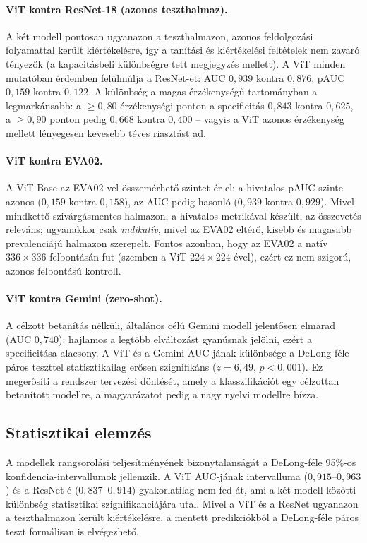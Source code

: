 \paragraph{ViT kontra ResNet-18 (azonos teszthalmaz).} A két modell pontosan
ugyanazon a teszthalmazon, azonos feldolgozási folyamattal került kiértékelésre,
így a tanítási és kiértékelési feltételek nem zavaró tényezők (a kapacitásbeli
különbségre tett megjegyzés mellett). A ViT minden mutatóban érdemben felülmúlja
a ResNet-et: AUC $0{,}939$ kontra $0{,}876$, pAUC $0{,}159$ kontra $0{,}122$. A
különbség a magas érzékenységű tartományban a legmarkánsabb: a $\ge 0{,}80$
érzékenységi ponton a specificitás $0{,}843$ kontra $0{,}625$, a $\ge 0{,}90$
ponton pedig $0{,}668$ kontra $0{,}400$ -- vagyis a ViT azonos érzékenység
mellett lényegesen kevesebb téves riasztást ad.

\paragraph{ViT kontra EVA02.} A ViT-Base
az EVA02-vel összemérhető szintet ér el: a
hivatalos pAUC szinte azonos ($0{,}159$ kontra $0{,}158$), az AUC pedig
hasonló ($0{,}939$ kontra $0{,}929$). Mivel mindkettő szivárgásmentes halmazon, a
hivatalos metrikával készült, az összevetés releváns; ugyanakkor csak
\emph{indikatív}, mivel az EVA02 eltérő, kisebb és magasabb prevalenciájú
halmazon szerepelt. Fontos azonban, hogy az EVA02 a natív $336\times336$ felbontásán fut
(szemben a ViT $224\times224$-ével), ezért ez nem szigorú, azonos felbontású
kontroll.

\paragraph{ViT kontra Gemini (zero-shot).} A célzott betanítás nélküli, általános
célú Gemini modell jelentősen elmarad (AUC $0{,}740$): hajlamos a legtöbb
elváltozást gyanúsnak jelölni, ezért a specificitása alacsony. A ViT és a Gemini
AUC-jának különbsége a DeLong-féle páros teszttel statisztikailag erősen
szignifikáns ($z = 6{,}49$, $p < 0{,}001$). Ez megerősíti a rendszer tervezési
döntését, amely a klasszifikációt egy célzottan betanított modellre, a
magyarázatot pedig a nagy nyelvi modellre bízza.

\subsection{Statisztikai elemzés}

A modellek rangsorolási teljesítményének bizonytalanságát a DeLong-féle 95\%-os
konfidencia-intervallumok jellemzik. A ViT AUC-jának intervalluma
($0{,}915$--$0{,}963$) és a ResNet-é ($0{,}837$--$0{,}914$) gyakorlatilag nem
fed át, ami a két modell közötti különbség statisztikai szignifikanciájára utal.
Mivel a ViT és a ResNet ugyanazon a teszthalmazon került kiértékelésre, a mentett
predikciókból a DeLong-féle páros teszt formálisan is elvégezhető.

